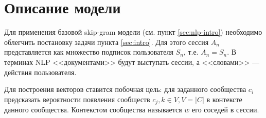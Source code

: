 \documentclass[times,specification,annotation]{itmo-student-thesis}
\begin{document}
\section{Описание модели}\label{sec:algo}

Для применения базовой skip-gram \cite{mikolov2013distributed} модели (см. пункт \ref{sec:nlp-intro}) необходимо облегчить постановку задачи пункта \ref{sec:intro}. Для этого сессия $A_n$ представляется как множество подписок пользователя $S_n$, т.е. $A_n = S_n$. В терминах NLP <<документами>> будут выступать сессии, а <<словами>> --- действия пользователя.

Для построения векторов ставится побочная цель: для заданного сообщества $c_i$ предсказать вероятности появления сообществ $c_j, k \in V, V = |C|$ в контексте данного сообщества. Контекстом сообщества называется $w$ его соседей в сессии. 
\end{document}
